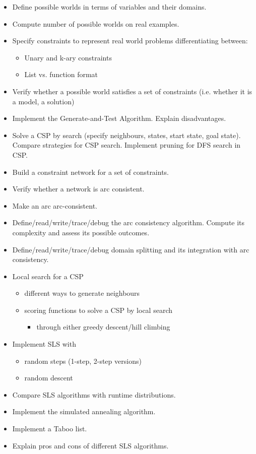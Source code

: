 \documentclass{article}
\begin{document}
\begin{itemize}
    \item Define possible worlds in terms of variables and their domains.
    \item Compute number of possible worlds on real examples.
    \item Specify constraints to represent real world problems differentiating between:
        \begin{itemize}
            \item Unary and k-ary constraints
            \item List vs. function format
        \end{itemize}
    \item Verify whether a possible world satisfies a set of constraints (i.e. whether it is a model, a solution)
    \item Implement the Generate-and-Test Algorithm. Explain disadvantages.
    \item Solve a CSP by search (specify neighbours, states, start state, goal state). Compare strategies for CSP search. Implement pruning for DFS search in CSP.
    \item Build a constraint network for a set of constraints.
    \item Verify whether a network is arc consistent.
    \item Make an arc arc-consistent.
    \item Define/read/write/trace/debug the arc consistency algorithm. Compute its complexity and assess its possible outcomes.
    \item Define/read/write/trace/debug domain splitting and its integration with arc consistency.
    \item Local search for a CSP
        \begin{itemize}
            \item different ways to generate neighbours
            \item scoring functions to solve a CSP by local search
                \begin{itemize}
                    \item through either greedy descent/hill climbing
                \end{itemize}
        \end{itemize}
    \item Implement SLS with
        \begin{itemize}
            \item random steps (1-step, 2-step versions)
            \item random descent
        \end{itemize}
    \item Compare SLS algorithms with runtime distributions.
    \item Implement the simulated annealing algorithm.
    \item Implement a Taboo list.
    \item Explain pros and cons of different SLS algorithms.
\end{itemize}
\end{document}
